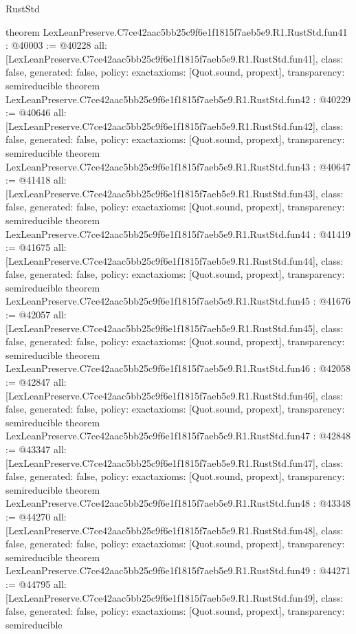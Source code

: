 \begin{lexlean}{RustStd}
\begin{coremodule}
{}
theorem LexLeanPreserve.C7ce42aac5bb25c9f6e1f1815f7aeb5e9.R1.RustStd.fun41 : @40003 := @40228 {
  all: [LexLeanPreserve.C7ce42aac5bb25c9f6e1f1815f7aeb5e9.R1.RustStd.fun41],
  class: false,
  generated: false,
  policy: exact{axioms: [Quot.sound, propext]},
  transparency: semireducible
}
theorem LexLeanPreserve.C7ce42aac5bb25c9f6e1f1815f7aeb5e9.R1.RustStd.fun42 : @40229 := @40646 {
  all: [LexLeanPreserve.C7ce42aac5bb25c9f6e1f1815f7aeb5e9.R1.RustStd.fun42],
  class: false,
  generated: false,
  policy: exact{axioms: [Quot.sound, propext]},
  transparency: semireducible
}
theorem LexLeanPreserve.C7ce42aac5bb25c9f6e1f1815f7aeb5e9.R1.RustStd.fun43 : @40647 := @41418 {
  all: [LexLeanPreserve.C7ce42aac5bb25c9f6e1f1815f7aeb5e9.R1.RustStd.fun43],
  class: false,
  generated: false,
  policy: exact{axioms: [Quot.sound, propext]},
  transparency: semireducible
}
theorem LexLeanPreserve.C7ce42aac5bb25c9f6e1f1815f7aeb5e9.R1.RustStd.fun44 : @41419 := @41675 {
  all: [LexLeanPreserve.C7ce42aac5bb25c9f6e1f1815f7aeb5e9.R1.RustStd.fun44],
  class: false,
  generated: false,
  policy: exact{axioms: [Quot.sound, propext]},
  transparency: semireducible
}
theorem LexLeanPreserve.C7ce42aac5bb25c9f6e1f1815f7aeb5e9.R1.RustStd.fun45 : @41676 := @42057 {
  all: [LexLeanPreserve.C7ce42aac5bb25c9f6e1f1815f7aeb5e9.R1.RustStd.fun45],
  class: false,
  generated: false,
  policy: exact{axioms: [Quot.sound, propext]},
  transparency: semireducible
}
theorem LexLeanPreserve.C7ce42aac5bb25c9f6e1f1815f7aeb5e9.R1.RustStd.fun46 : @42058 := @42847 {
  all: [LexLeanPreserve.C7ce42aac5bb25c9f6e1f1815f7aeb5e9.R1.RustStd.fun46],
  class: false,
  generated: false,
  policy: exact{axioms: [Quot.sound, propext]},
  transparency: semireducible
}
theorem LexLeanPreserve.C7ce42aac5bb25c9f6e1f1815f7aeb5e9.R1.RustStd.fun47 : @42848 := @43347 {
  all: [LexLeanPreserve.C7ce42aac5bb25c9f6e1f1815f7aeb5e9.R1.RustStd.fun47],
  class: false,
  generated: false,
  policy: exact{axioms: [Quot.sound, propext]},
  transparency: semireducible
}
theorem LexLeanPreserve.C7ce42aac5bb25c9f6e1f1815f7aeb5e9.R1.RustStd.fun48 : @43348 := @44270 {
  all: [LexLeanPreserve.C7ce42aac5bb25c9f6e1f1815f7aeb5e9.R1.RustStd.fun48],
  class: false,
  generated: false,
  policy: exact{axioms: [Quot.sound, propext]},
  transparency: semireducible
}
theorem LexLeanPreserve.C7ce42aac5bb25c9f6e1f1815f7aeb5e9.R1.RustStd.fun49 : @44271 := @44795 {
  all: [LexLeanPreserve.C7ce42aac5bb25c9f6e1f1815f7aeb5e9.R1.RustStd.fun49],
  class: false,
  generated: false,
  policy: exact{axioms: [Quot.sound, propext]},
  transparency: semireducible
}
\end{coremodule}
\end{lexlean}

